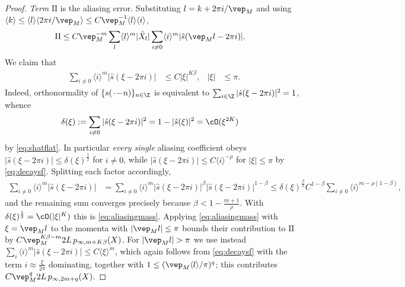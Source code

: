 \documentclass[a4paper, 11pt]{article}
\DeclareMathOperator{\1}{\mathds{1}}
\begin{document}
\begin{proof}
\emph{Term} $\mathrm{II}$ is the aliasing error. Substituting $l = k+2\pi i/\vep_{M}$ and using $\langle k\rangle\leq\langle l\rangle\langle2\pi i/\vep_{M}\rangle\leq C\vep_{M}^{-1}\langle l\rangle\langle i\rangle$,
\begin{align*}
\mathrm{II} & \leq C\vep_{M}^{-m}\sum_{l}\langle l\rangle^{m}|\hat{X}_{l}|\sum_{i\neq0}\langle i\rangle^{m}|\hat{s}(\vep_{M}l-2\pi i)|.
\end{align*}
We claim that
\begin{align}
\label{eq:aliasingmass}
\sum_{i\neq0}\langle i\rangle^{m}|\hat{s}(\xi-2\pi i)| & \leq C|\xi|^{K\beta}, & |\xi| & \leq\pi.
\end{align}
Indeed, orthonormality of $\{s(\!\ \cdot\!-\!n)\}_{n\in\Z}$ is equivalent to $\sum_{i\in\Z}|\hat{s}(\xi-2\pi i)|^{2}=1$, whence
\begin{align*}
\delta(\xi) & := \sum_{i\neq0}|\hat{s}(\xi-2\pi i)|^{2} = 1-|\hat{s}(\xi)|^{2} = \cO(\xi^{2K})
\end{align*}
by \eqref{eq:shatflat}. In particular \emph{every single} aliasing coefficient obeys $|\hat{s}(\xi-2\pi i)|\leq\delta(\xi)^{\frac{1}{2}}$ for $i\neq0$, while $|\hat{s}(\xi-2\pi i)|\leq C\langle i\rangle^{-\rho}$ for $|\xi|\leq\pi$ by \eqref{eq:decaysf}. Splitting each factor accordingly,
\begin{align*}
\sum_{i\neq0}\langle i\rangle^{m}|\hat{s}(\xi-2\pi i)| & = \sum_{i\neq0}\langle i\rangle^{m}|\hat{s}(\xi-2\pi i)|^{\beta}|\hat{s}(\xi-2\pi i)|^{1-\beta} \leq \delta(\xi)^{\frac{\beta}{2}}C^{1-\beta}\!\!\sum_{i\neq0}\!\langle i\rangle^{m-\rho(1-\beta)},
\end{align*}
and the remaining sum converges precisely because $\beta<1-\tfrac{m+1}{\rho}$. With $\delta(\xi)^{\frac{1}{2}}=\cO(|\xi|^{K})$ this is \eqref{eq:aliasingmass}. Applying \eqref{eq:aliasingmass} with $\xi = \vep_{M}l$ to the momenta with $|\vep_{M}l|\leq\pi$ bounds their contribution to $\mathrm{II}$ by $C\vep_{M}^{K\beta-m}2L\!\ p_{\infty,m+K\beta}(X)$. For $|\vep_{M}l|>\pi$ we use instead $\sum_{i}\langle i\rangle^{m}|\hat{s}(\xi-2\pi i)|\leq C\langle\xi\rangle^{m}$, which again follows from \eqref{eq:decaysf} with the term $i\approx\tfrac{\xi}{2\pi}$ dominating, together with $1\leq(\vep_{M}\langle l\rangle/\pi)^{q}$; this contributes $C\vep_{M}^{q}2L\!\ p_{\infty,2m+q}(X)$.
\end{proof}
\end{document}
